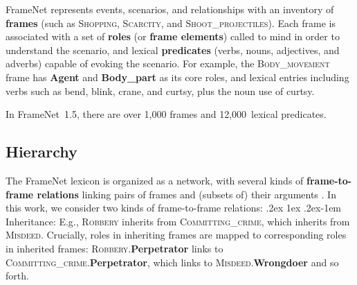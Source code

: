 \documentclass[11pt,a4paper]{article}
\makeatletter
\newcommand{\ensuretext}[1]{#1}
\newcommand{\nssmarker}{\ensuretext{\textcolor{magenta}{\ensuremath{^{\textsc{NS}}_{\textsc{S}}}}}}
\newcommand{\arkcomment}[3]{\ensuretext{\textcolor{#3}{[#1 #2]}}}
\newcommand{\nss}[1]{\arkcomment{\nssmarker}{#1}{magenta}}
\renewcommand{\paragraph}{%
  \@startsection{paragraph}{4}%
  {\z@}{.2ex \@plus 1ex \@minus .2ex}{-1em}%
  {\normalfont\normalsize\bfseries}%
}
\newcommand{\fnf}[1]{\textsc{\textsf{#1}}} %
\newcommand{\fnr}[1]{\textbf{\textsf{#1}}} %
\newcommand{\fnlu}[1]{\textsf{#1}} %
\newcommand{\finalversion}[1]{}
\makeatother
\begin{document}


FrameNet represents events, scenarios, and relationships 
with an inventory of \textbf{frames} (such as \fnf{Shopping}, \fnf{Scarcity}, and \fnf{Shoot\_projectiles}). 
Each frame is associated with a set of \textbf{roles} (or \textbf{frame elements}) 
called to mind in order to understand the scenario,
and lexical \textbf{predicates} (verbs, nouns, adjectives, and adverbs) capable of 
evoking the scenario. 
For example, the \fnf{Body\_movement} frame has \fnr{Agent} and \fnr{Body\_part} as its core roles, 
and lexical entries including verbs such as \fnlu{bend}, \fnlu{blink}, \fnlu{crane}, and \fnlu{curtsy}, 
plus the noun use of \fnlu{curtsy}.
\finalversion{
In the annotated sentence in \cref{fig:harbor-fn},
\fnf{Body\_movement} is evoked by \textit{crane}, and 3~of its roles are filled by overt arguments: 
the 2~core roles (\fnr{Agent}, \fnr{Body\_part}) happen to be filled by noun phrases 
(\textit{passengers}, \textit{their necks}), while the non-core role \fnr{Purpose} is filled by a 
prepositional phrase adjunct (\textit{for dizzying glimpses of the harbor}).
}
In FrameNet~1.5, there are over 1,000 frames and 12,000~lexical predicates.



\subsection{Hierarchy}

The FrameNet lexicon is organized as a network, with several kinds of \textbf{frame-to-frame relations} 
linking pairs of frames and (subsets of) their arguments \citep{ruppenhofer-10}. 
In this work, we consider two kinds of frame-to-frame relations:
\paragraph{Inheritance:} 
E.g., \fnf{Robbery} inherits from \fnf{Committing\_crime}, which inherits from \fnf{Misdeed}. 
Crucially, roles in inheriting frames are mapped to corresponding roles in inherited frames: \fnf{Robbery}.\fnr{Perpetrator} links to
\fnf{Committing\_crime}.\fnr{Perpetrator}, which links to \fnf{Misdeed}.\fnr{Wrongdoer} and so forth.
\end{document}

